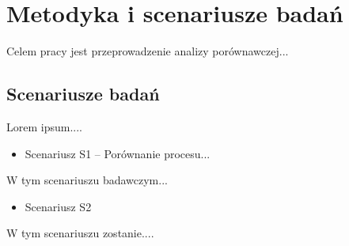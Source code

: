\section{Metodyka i scenariusze badań}

Celem pracy jest przeprowadzenie analizy porównawczej...

    \subsection{Scenariusze badań}

    Lorem ipsum....

    \begin{itemize}
    \item Scenariusz S1 – Porównanie procesu...
    \end{itemize}

    W tym scenariuszu badawczym...

    \begin{itemize}
    \item Scenariusz S2
    \end{itemize}

    W tym scenariuszu zostanie....